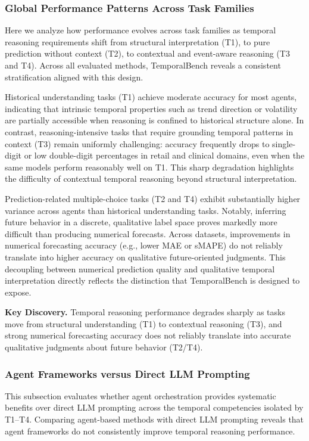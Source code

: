 \subsubsection{Global Performance Patterns Across Task Families}
Here we analyze how performance evolves across task families as temporal reasoning requirements shift from structural interpretation (T1), to pure prediction without context (T2), to contextual and event-aware reasoning (T3 and T4). Across all evaluated methods, TemporalBench reveals a consistent stratification aligned with this design.

Historical understanding tasks (T1) achieve moderate accuracy for most agents, indicating that intrinsic temporal properties such as trend direction or volatility are partially accessible when reasoning is confined to historical structure alone. In contrast, reasoning-intensive tasks that require grounding temporal patterns in context (T3) remain uniformly challenging: accuracy frequently drops to single-digit or low double-digit percentages in retail and clinical domains, even when the same models perform reasonably well on T1. This sharp degradation highlights the difficulty of contextual temporal reasoning beyond structural interpretation.

Prediction-related multiple-choice tasks (T2 and T4) exhibit substantially higher variance across agents than historical understanding tasks. Notably, inferring future behavior in a discrete, qualitative label space proves markedly more difficult than producing numerical forecasts. Across datasets, improvements in numerical forecasting accuracy (e.g., lower MAE or sMAPE) do not reliably translate into higher accuracy on qualitative future-oriented judgments. This decoupling between numerical prediction quality and qualitative temporal interpretation directly reflects the distinction that TemporalBench is designed to expose.

\begin{keydiscovery1}
\textbf{Key Discovery.}
Temporal reasoning performance degrades sharply as tasks move from structural understanding (T1) to contextual reasoning (T3), and strong numerical forecasting accuracy does not reliably translate into accurate qualitative judgments about future behavior (T2/T4).
\end{keydiscovery1}

\subsubsection{Agent Frameworks versus Direct LLM Prompting}
This subsection evaluates whether agent orchestration provides systematic benefits over direct LLM prompting across the temporal competencies isolated by T1--T4. Comparing agent-based methods with direct LLM prompting reveals that agent frameworks do not consistently improve temporal reasoning performance.

